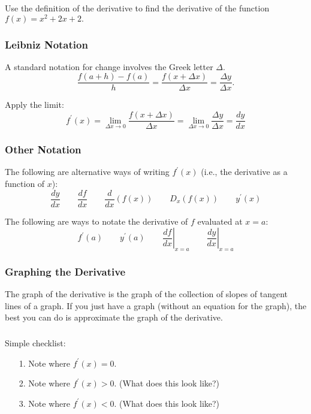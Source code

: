 \documentclass[14pt]{beamer}
\begin{document}
\begin{frame}
\frametitle{}
Use the definition of the derivative to find the derivative of the function $f(x)=x^2+2x+2.$
\end{frame}

\begin{frame}
\frametitle{Leibniz Notation}
\small
A standard notation for change involves the Greek letter $\Delta$. 
\[\frac{f(a+h)-f(a)}{h}=\frac{f(x+\Delta x)}{\Delta x}=\frac{\Delta y}{\Delta x}.\]

\vspace{2pc}
Apply the limit:
\[f^{\prime}(x)=\lim_{\Delta x \to 0} \frac{f(x+\Delta x)}{\Delta x}=\lim_{\Delta x \to 0} \frac{\Delta y}{\Delta x}=\frac{dy}{dx}\]
\end{frame}

\begin{frame}
\frametitle{Other Notation}
\small
The following are alternative ways of writing $f^{\prime}(x)$ (i.e., the derivative as a function of $x$):
\[\frac{dy}{dx}\qquad\frac{df}{dx} \qquad\frac{d}{dx}\left(f(x)\right) \qquad D_x (f(x)) \qquad y^{\prime}(x)\]

\vspace{2pc}
The following are ways to notate the derivative of $f$ evaluated at $x=a$:
\[f^{\prime}(a)\qquad y^{\prime}(a) \qquad \left. \frac{df}{dx} \right|_{x=a} \qquad \left. \frac{dy}{dx} \right|_{x=a}\]
\end{frame}

\begin{frame}
\frametitle{Graphing the Derivative}
\small
The graph of the derivative is the graph of the collection of slopes of tangent lines of a graph.  If you just have a graph (without an equation for the graph), the best you can do is approximate the graph of the derivative.
\end{frame}

\begin{frame}
\frametitle{}
\footnotesize
Simple checklist:
\begin{itemize}
\item[1.] Note where $f^{\prime}(x)=0$.
\item[2.]  Note where $f^{\prime}(x)>0$.  (What does this look like?)
\item[3.]  Note where $f^{\prime}(x)<0$.  (What does this look like?)
\end{itemize}
\end{frame}
\end{document}
